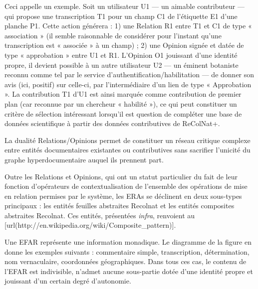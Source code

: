 Ceci appelle un exemple.
Soit un utilisateur U1 --- un aimable contributeur --- qui propose une transcription T1 pour un champ C1 de l'étiquette E1 d'une planche P1.
Cette action générera :
1) une Relation R1 entre T1 et C1 de type « association » (il semble raisonnable de considérer pour l'instant qu'une transcription est « associée » à un champ) ;
2) une Opinion signée et datée de type « approbation » entre U1 et R1.
L'Opinion O1 jouissant d'une identité propre, il devient possible à un autre utilisateur U2 --- un éminent botaniste reconnu comme tel par le service d'authentification/habilitation --- de donner son avis (ici, positif) sur celle-ci, par l'intermédiaire d'un lien de type « Approbation ».
La contribution T1 d'U1 est ainsi marquée comme contribution de premier plan (car reconnue par un chercheur « habilité »), ce qui peut constituer un critère de sélection intéressant lorsqu'il est question de compléter une base de données scientifique à partir des données contributives de ReColNat+.

La dualité Relations/Opinions permet de constituer un réseau critique complexe entre entités documentaires existantes ou contributives sans sacrifier l'unicité du graphe hyperdocumentaire auquel ils prennent part.

\stopsection
\startsection[title={Sous-types d'ERAs}]

Outre les Relations et Opinions, qui ont un statut particulier du fait de leur fonction d'opérateurs de contextualisation de l'ensemble des opérations de mise en relation permises par le système, les ERAs se déclinent en deux sous-types principaux : les entités feuilles abstraites Recolnat et les entités composites abstraites Recolnat.
Ces entités, présentées {\it infra}, renvoient au [url(http://en.wikipedia.org/wiki/Composite_pattern)].

\startsubsection[title={Entité feuille abstraite Recolnat (EFAR)}]

Une EFAR représente une information monadique.
Le diagramme de la figure  en donne les exemples suivants : commentaire simple, transcription, détermination, nom vernaculaire, coordonnées géographiques.
Dans tous ces cas, le contenu de l'EFAR est indivisible, n'admet aucune sous-partie dotée d'une identité propre et jouissant d'un certain degré d'autonomie.

